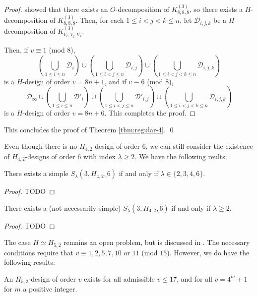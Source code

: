\begin{proof}
\cite{hanani} showed that there exists an $O$-decomposition of
$K_{8,8,8}^{(3)}$, so there exists a $H$-decomposition of $K_{8,8,8}^{(3)}$.
Then, for each $1 \leq i < j < k \leq n$, let $\mathcal{D}_{i,j,k}$ be a
$H$-decomposition of $K_{V_i,V_j,V_k}^{(3)}$.

Then, if $v \equiv 1$ (mod 8),
\[
    \left( \bigcup_{1 \leq i \leq n} \mathcal{D}_i \right)
    \cup \left( \bigcup_{1 \leq i < j \leq n} \mathcal{D}_{i,j} \right)
    \cup \left( \bigcup_{1 \leq i < j < k \leq n} \mathcal{D}_{i,j,k} \right)
\]
is a $H$-design of order $v = 8n+1$, and if $v \equiv 6$ (mod 8),
\[
    \mathcal{D}_\infty \cup \left( \bigcup_{1 \leq i \leq n}
    \mathcal{D}'_i \right) \cup \left( \bigcup_{1 \leq i < j \leq n}
    \mathcal{D}'_{i,j} \right) \cup \left( \bigcup_{1
    \leq i < j < k \leq n} \mathcal{D}_{i,j,k} \right)
\]
is a $H$-design of order $v = 8n+6$. This completes the proof.

\end{proof}

This concludes the proof of Theorem \ref{thm:regular-4}. \qed

Even though there is no $H_{4,2}$-design of order $6$, we can still consider the existence of $H_{4,2}$-designs of order $6$ with index $\lambda \geq 2$.
We have the following reults:

\begin{theorem} \label{thm:H_42-6-simple}
There exists a simple $S_{\lambda}(3, H_{4,2}, 6)$ if and only if $\lambda \in \{2, 3, 4, 6\}$.
\end{theorem}

\begin{proof}
TODO
\end{proof}

\begin{theorem} \label{thm:H_42-6}
There exists a (not necessarily simple) $S_{\lambda}(3, H_{4,2}, 6)$ if and only if $\lambda \geq 2$.
\end{theorem}

\begin{proof}
TODO
\end{proof}




The case $H \simeq H_{5,2}$ remains an open problem, but is discussed in \cite{mesz-rosa}.
The necessary conditions require that $v \equiv 1, 2, 5, 7, 10$ or $11$ (mod $15$).
However, we do have the following results:

\begin{theorem} \label{thm:H_52}
An $H_{5,2}$-design of order $v$ exists for all admissible $v \leq 17$, and for
all $v = 4^m + 1$ for $m$ a positive integer.
\end{theorem}

